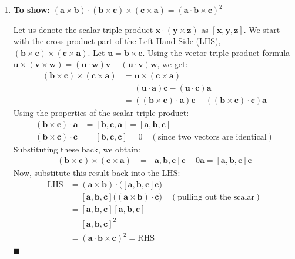 \documentclass[12pt,a4paper]{article}
\begin{document}
\begin{enumerate}
\begin{tcolorbox}[enhanced,breakable,ansbox,colback=cD!4,colframe=cD,boxrule=0.8pt,arc=5pt,title={\textbf{Answer}},fonttitle=\bfseries\color{white},colbacktitle=cD]

\begin{enumerate}
    \item[\textbf{(a)}] \textbf{To show:} $(\mathbf{a}\times\mathbf{b})\cdot(\mathbf{b}\times\mathbf{c})\times(\mathbf{c}\times\mathbf{a})=(\mathbf{a}\cdot\mathbf{b}\times\mathbf{c})^{2}$
    
    Let us denote the scalar triple product $\mathbf{x}\cdot(\mathbf{y}\times\mathbf{z})$ as $[\mathbf{x}, \mathbf{y}, \mathbf{z}]$. 
    We start with the cross product part of the Left Hand Side (LHS), $(\mathbf{b}\times\mathbf{c})\times(\mathbf{c}\times\mathbf{a})$. 
    Let $\mathbf{u} = \mathbf{b}\times\mathbf{c}$. Using the vector triple product formula $\mathbf{u}\times(\mathbf{v}\times\mathbf{w}) = (\mathbf{u}\cdot\mathbf{w})\mathbf{v} - (\mathbf{u}\cdot\mathbf{v})\mathbf{w}$, we get:
    \begin{align*}
        (\mathbf{b}\times\mathbf{c})\times(\mathbf{c}\times\mathbf{a}) &= \mathbf{u}\times(\mathbf{c}\times\mathbf{a}) \\
        &= (\mathbf{u}\cdot\mathbf{a})\mathbf{c} - (\mathbf{u}\cdot\mathbf{c})\mathbf{a} \\
        &= ((\mathbf{b}\times\mathbf{c})\cdot\mathbf{a})\mathbf{c} - ((\mathbf{b}\times\mathbf{c})\cdot\mathbf{c})\mathbf{a}
    \end{align*}
    Using the properties of the scalar triple product:
    \begin{align*}
        (\mathbf{b}\times\mathbf{c})\cdot\mathbf{a} &= [\mathbf{b}, \mathbf{c}, \mathbf{a}] = [\mathbf{a}, \mathbf{b}, \mathbf{c}] \\
        (\mathbf{b}\times\mathbf{c})\cdot\mathbf{c} &= [\mathbf{b}, \mathbf{c}, \mathbf{c}] = 0 \quad (\text{since two vectors are identical})
    \end{align*}
    Substituting these back, we obtain:
    \begin{align*}
        (\mathbf{b}\times\mathbf{c})\times(\mathbf{c}\times\mathbf{a}) &= [\mathbf{a}, \mathbf{b}, \mathbf{c}]\mathbf{c} - 0\mathbf{a} = [\mathbf{a}, \mathbf{b}, \mathbf{c}]\mathbf{c}
    \end{align*}
    Now, substitute this result back into the LHS:
    \begin{align*}
        \text{LHS} &= (\mathbf{a}\times\mathbf{b})\cdot \big( [\mathbf{a}, \mathbf{b}, \mathbf{c}]\mathbf{c} \big) \\
        &= [\mathbf{a}, \mathbf{b}, \mathbf{c}] \big( (\mathbf{a}\times\mathbf{b})\cdot\mathbf{c} \big) \quad (\text{pulling out the scalar}) \\
        &= [\mathbf{a}, \mathbf{b}, \mathbf{c}] [\mathbf{a}, \mathbf{b}, \mathbf{c}] \\
        &= [\mathbf{a}, \mathbf{b}, \mathbf{c}]^2 \\
        &= (\mathbf{a}\cdot\mathbf{b}\times\mathbf{c})^2 = \text{RHS}
    \end{align*}
    \hfill $\blacksquare$


\end{enumerate}
\end{tcolorbox}
\end{enumerate}
\end{document}
